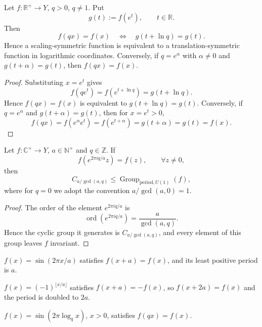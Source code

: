 \begin{proposition}\label{prop:scaling_log_translation}
Let $f:\mathbb{R}^+\to Y$, $q>0$, $q\neq 1$. Put
\[
g(t):=f(e^t),\qquad t\in\mathbb{R}.
\]
Then
\[
f(qx)=f(x)\quad\Longleftrightarrow\quad g(t+\ln q)=g(t).
\]
Hence a scaling-symmetric function is equivalent to a translation-symmetric function in logarithmic coordinates. Conversely, if $q=e^\alpha$ with $\alpha\neq 0$ and $g(t+\alpha)=g(t)$, then $f(qx)=f(x)$.
\end{proposition}

\begin{proof}
Substituting $x=e^t$ gives
\[
f(qe^t)=f(e^{t+\ln q})=g(t+\ln q).
\]
Hence $f(qx)=f(x)$ is equivalent to $g(t+\ln q)=g(t)$. Conversely, if $q=e^\alpha$ and $g(t+\alpha)=g(t)$, then for $x=e^t>0$,
\[
f(qx)=f(e^\alpha e^t)=f(e^{t+\alpha})=g(t+\alpha)=g(t)=f(x).
\]
\end{proof}

\begin{proposition}\label{prop:rotation_unit_root_order}
Let $f:\mathbb{C}^\times\to Y$, $a\in\mathbb{N}^+$ and $q\in\mathbb{Z}$. If
\[
f(e^{2\pi i q/a}z)=f(z),\qquad \forall z\neq 0,
\]
then
\[
C_{a/\gcd(a,q)}\le \operatorname{Group}_{\mathrm{period},U(1)}(f),
\]
where for $q=0$ we adopt the convention $a/\gcd(a,0)=1$.
\end{proposition}

\begin{proof}
The order of the element $e^{2\pi i q/a}$ is
\[
\operatorname{ord}\!\left(e^{2\pi i q/a}\right)=\frac{a}{\gcd(a,q)}.
\]
Hence the cyclic group it generates is $C_{a/\gcd(a,q)}$, and every element of this group leaves $f$ invariant.
\end{proof}

\begin{example}\label{ex:translation_symmetric}
$f(x)=\sin(2\pi x/a)$ satisfies $f(x+a)=f(x)$, and its least positive period is $a$.
\end{example}

\begin{example}[Antiperiodicity]\label{ex:antiperiod}
$f(x)=(-1)^{\lfloor x/a\rfloor}$ satisfies $f(x+a)=-f(x)$, so $f(x+2a)=f(x)$ and the period is doubled to $2a$.
\end{example}

\begin{example}\label{ex:scaling_symmetric}
$f(x)=\sin(2\pi\log_q x)$, $x>0$, satisfies $f(qx)=f(x)$.
\end{example}

